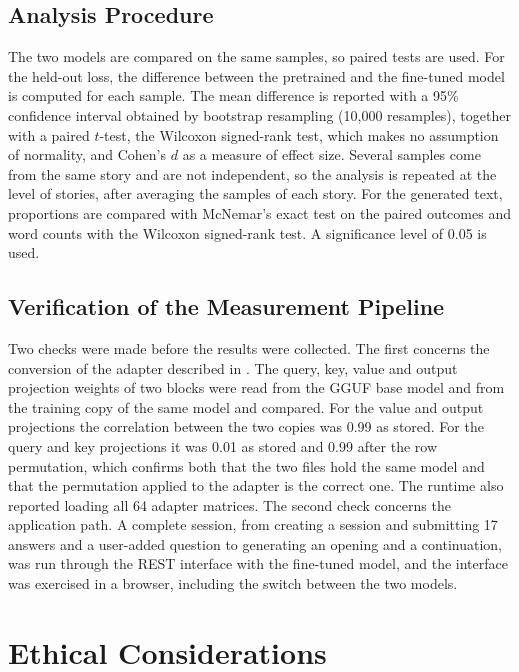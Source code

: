 \subsection{Analysis Procedure}

The two models are compared on the same samples, so paired tests are used. For the held-out loss, the difference between the pretrained and the fine-tuned model is computed for each sample. The mean difference is reported with a 95\% confidence interval obtained by bootstrap resampling (10,000 resamples), together with a paired $t$-test, the Wilcoxon signed-rank test, which makes no assumption of normality, and Cohen's $d$ as a measure of effect size. Several samples come from the same story and are not independent, so the analysis is repeated at the level of stories, after averaging the samples of each story. For the generated text, proportions are compared with McNemar's exact test on the paired outcomes and word counts with the Wilcoxon signed-rank test. A significance level of 0.05 is used.

\subsection{Verification of the Measurement Pipeline}
\label{sec:model-verification}

Two checks were made before the results were collected. The first concerns the conversion of the adapter described in . The query, key, value and output projection weights of two blocks were read from the GGUF base model and from the training copy of the same model and compared. For the value and output projections the correlation between the two copies was 0.99 as stored. For the query and key projections it was 0.01 as stored and 0.99 after the row permutation, which confirms both that the two files hold the same model and that the permutation applied to the adapter is the correct one. The runtime also reported loading all 64 adapter matrices. The second check concerns the application path. A complete session, from creating a session and submitting 17 answers and a user-added question to generating an opening and a continuation, was run through the REST interface with the fine-tuned model, and the interface was exercised in a browser, including the switch between the two models.

\section{Ethical Considerations}
\label{sec:model-ethics}

